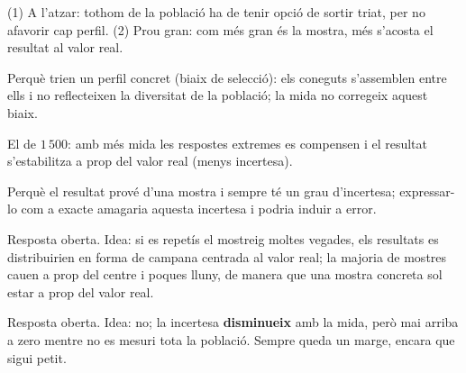 \begin{solucions}
\begin{sollist}
  \item (1) A l'atzar: tothom de la població ha de tenir opció de sortir triat, per no
        afavorir cap perfil. (2) Prou gran: com més gran és la mostra, més s'acosta el
        resultat al valor real.
  \item Perquè trien un perfil concret (biaix de selecció): els coneguts s'assemblen entre
        ells i no reflecteixen la diversitat de la població; la mida no corregeix aquest
        biaix.
  \item El de $1\,500$: amb més mida les respostes extremes es compensen i el resultat
        s'estabilitza a prop del valor real (menys incertesa).
  \item Perquè el resultat prové d'una mostra i sempre té un grau d'incertesa; expressar-lo
        com a exacte amagaria aquesta incertesa i podria induir a error.
  \item Resposta oberta. Idea: si es repetís el mostreig moltes vegades, els resultats es
        distribuirien en forma de campana centrada al valor real; la majoria de mostres
        cauen a prop del centre i poques lluny, de manera que una mostra concreta sol
        estar a prop del valor real.
  \item Resposta oberta. Idea: no; la incertesa \textbf{disminueix} amb la mida, però mai
        arriba a zero mentre no es mesuri tota la població. Sempre queda un marge, encara
        que sigui petit.
\end{sollist}
\end{solucions}

